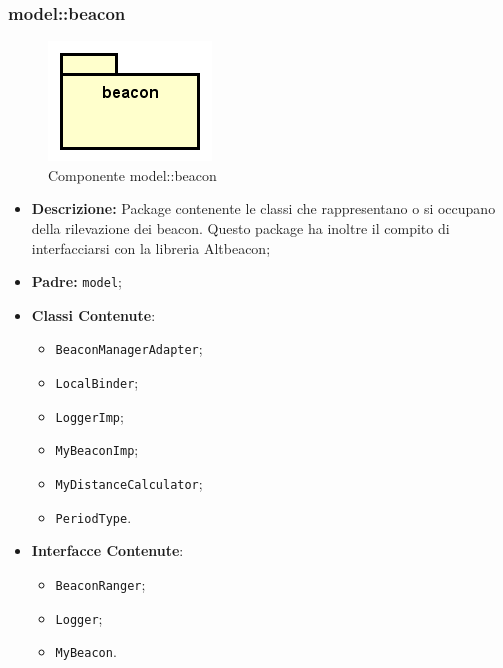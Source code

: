 \documentclass[../DefinizioneDiProdotto.tex]{subfiles}
\begin{document}
\subsubsection{model::\-beacon}

\begin{figure}[H]
	\centering
	\includegraphics[width=\maxwidth]{img/package/beacon.png}
	\caption{Componente model::\-beacon}\label{fig:model::beacon} 
\end{figure}
\begin{itemize}
	\item \textbf{Descrizione:} Package contenente le classi che rappresentano o si occupano della rilevazione dei beacon. Questo package ha inoltre il compito di interfacciarsi con la libreria Altbeacon;
	\item \textbf{Padre:} \texttt{model};
	\item \textbf{Classi Contenute}:
	\begin{itemize}
		\item \texttt{BeaconManagerAdapter};
		
		\item \texttt{LocalBinder};
		
		\item \texttt{LoggerImp};
		
		\item \texttt{MyBeaconImp};
		
		\item \texttt{MyDistanceCalculator};
		
		\item \texttt{PeriodType}.
		
	\end{itemize}
	\item \textbf{Interfacce Contenute}:
	\begin{itemize}
		\item \texttt{BeaconRanger};
		
		\item \texttt{Logger};
		
		\item \texttt{MyBeacon}.
		
	\end{itemize}
\end{itemize}
\end{document}
